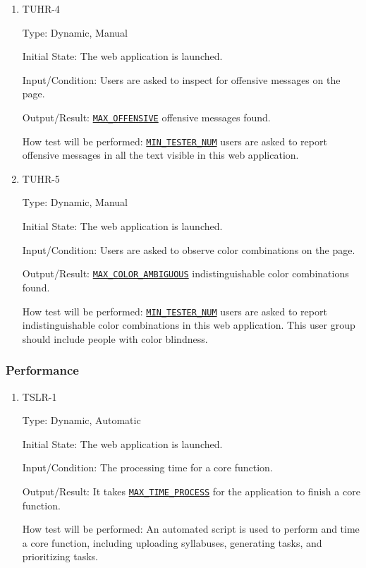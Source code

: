 \documentclass[12pt, titlepage]{article}
\begin{document}
\begin{enumerate}
\item{TUHR-4\\}\label{TUHR-4}

Type: Dynamic, Manual
					
Initial State: The web application is launched.
					
Input/Condition: Users are asked to inspect for offensive messages on the page.
					
Output/Result: \hyperref[MAX_OFFENSIVE]{\texttt{MAX\_OFFENSIVE}} offensive messages found.
					
How test will be performed: \hyperref[MIN_TESTER_NUM]{\texttt{MIN\_TESTER\_NUM}} users are asked to report offensive messages in all the text visible in this web application.

\item{TUHR-5\\}\label{TUHR-5}

Type: Dynamic, Manual
					
Initial State: The web application is launched.
					
Input/Condition: Users are asked to observe color combinations on the page.
					
Output/Result: \hyperref[MAX_COLOR_AMBIGUOUS]{\texttt{MAX\_COLOR\_AMBIGUOUS}} indistinguishable color combinations found.
					
How test will be performed: \hyperref[MIN_TESTER_NUM]{\texttt{MIN\_TESTER\_NUM}} users are asked to report indistinguishable color combinations in this web application. This user group should include people with color blindness.


\end{enumerate}

\subsubsection{Performance}

\begin{enumerate}
\item{TSLR-1\\}\label{TSLR-1}

Type: Dynamic, Automatic
					
Initial State: The web application is launched.
					
Input/Condition: The processing time for a core function.
					
Output/Result: It takes \hyperref[MAX_TIME_PROCESS]{\texttt{MAX\_TIME\_PROCESS}} for the application to finish a core function.
					
How test will be performed: An automated script is used to perform and time a core function, including uploading syllabuses, generating tasks, and prioritizing tasks.

\end{enumerate}
\end{document}
